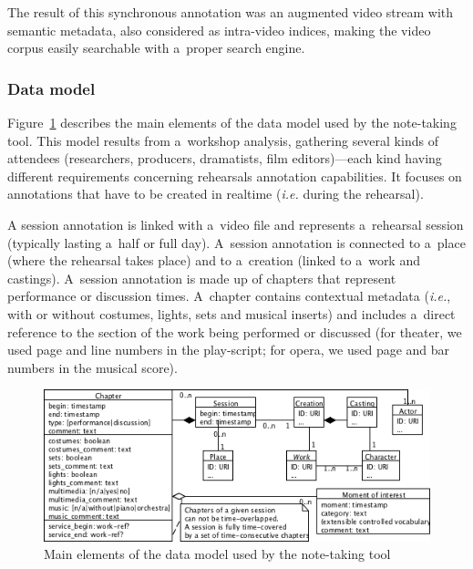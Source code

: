 \documentclass[conference]{IEEEtran}
\newcommand{\todo}[1]{\noindent\textcolor{red}{{\bf \{ToDo} #1{\bf \}}}}
\begin{document}
The result of this synchronous annotation was an augmented  video stream with semantic metadata, also considered as intra-video indices, making the video corpus easily searchable with a~proper search engine.

\subsubsection{Data model} Figure~\ref{fig_data_model} describes the main elements of the data model used by the note-taking tool. This model results from a~workshop analysis, gathering several kinds of attendees (researchers, producers, dramatists, film editors)---each kind having different requirements concerning rehearsals annotation capabilities. It focuses on annotations that have to be created in realtime (\emph{i.e.} during the rehearsal). \newline

A session annotation is linked with a~video file and represents a~rehearsal session (typically lasting a~half or full day). A~session annotation is connected to a~place (where the rehearsal takes place) and to a~creation (linked to a~work and castings). A~session annotation is made up of chapters that represent performance or discussion times. A~chapter contains contextual metadata (\emph{i.e.}, with or without costumes, lights, sets and musical inserts) and includes a~direct reference to the section of the work being performed or discussed (for theater, we used page and line numbers in the play-script; for opera, we used page and bar numbers in the musical score). 



\begin{figure}[ht]
\centering
{
\includegraphics[width=0.8\linewidth]{UMLet_Data_model}
\caption{Main elements of the data model used by the note-taking tool}
\label{fig_data_model}
}
\end{figure}
\end{document}
